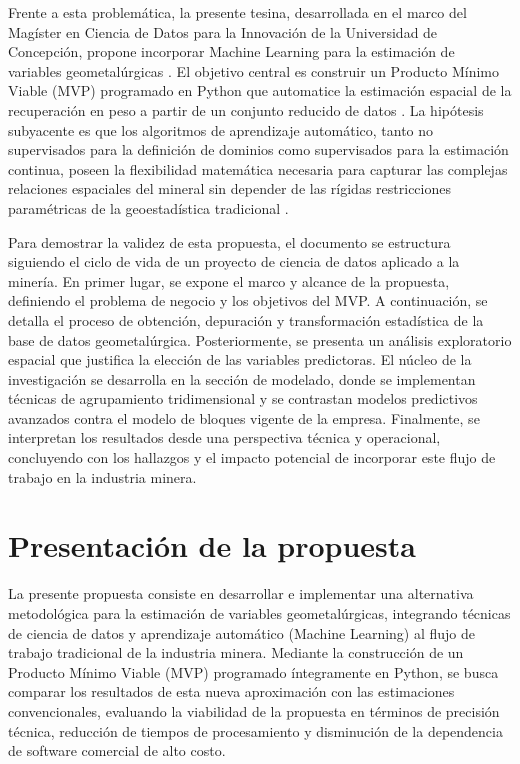 \documentclass[12pt,letterpaper]{article}
\begin{document}
	Frente a esta problemática, la presente tesina, desarrollada en el marco del 
	Magíster en Ciencia de Datos para la Innovación de la Universidad de Concepción, 
	propone incorporar Machine Learning para la estimación de variables 
	geometalúrgicas \cite{Nwaila2024}. El objetivo central es construir un Producto Mínimo Viable 
	(MVP) programado en Python que automatice la estimación espacial de la 
	recuperación en peso a partir de un conjunto reducido de datos \cite{Moreira2021}. La hipótesis 
	subyacente es que los algoritmos de aprendizaje automático, tanto no supervisados 
	para la definición de dominios como supervisados para la estimación continua, 
	poseen la flexibilidad matemática necesaria para capturar las complejas 
	relaciones espaciales del mineral sin depender de las rígidas restricciones 
	paramétricas de la geoestadística tradicional \cite{Moreira2021}.
	
	Para demostrar la validez de esta propuesta, el documento se estructura 
	siguiendo el ciclo de vida de un proyecto de ciencia de datos aplicado a la 
	minería. En primer lugar, se expone el marco y alcance de la propuesta, 
	definiendo el problema de negocio y los objetivos del MVP. A continuación, 
	se detalla el proceso de obtención, depuración y transformación estadística 
	de la base de datos geometalúrgica. Posteriormente, se presenta un análisis 
	exploratorio espacial que justifica la elección de las variables predictoras. 
	El núcleo de la investigación se desarrolla en la sección de modelado, donde 
	se implementan técnicas de agrupamiento tridimensional y se contrastan modelos 
	predictivos avanzados contra el modelo de bloques vigente de la empresa. 
	Finalmente, se interpretan los resultados desde una perspectiva técnica y 
	operacional, concluyendo con los hallazgos y el impacto potencial de incorporar 
	este flujo de trabajo en la industria minera.
		
	\section{Presentación de la propuesta}
	
	La presente propuesta consiste en desarrollar e implementar una alternativa 
	metodológica para la estimación de variables geometalúrgicas, integrando 
	técnicas de ciencia de datos y aprendizaje automático (Machine Learning) al 
	flujo de trabajo tradicional de la industria minera. Mediante la construcción 
	de un Producto Mínimo Viable (MVP) programado íntegramente en Python, se busca 
	comparar los resultados de esta nueva aproximación con las estimaciones 
	convencionales, evaluando la viabilidad de la propuesta en términos de 
	precisión técnica, reducción de tiempos de procesamiento y disminución de la 
	dependencia de software comercial de alto costo.
		
\end{document}
